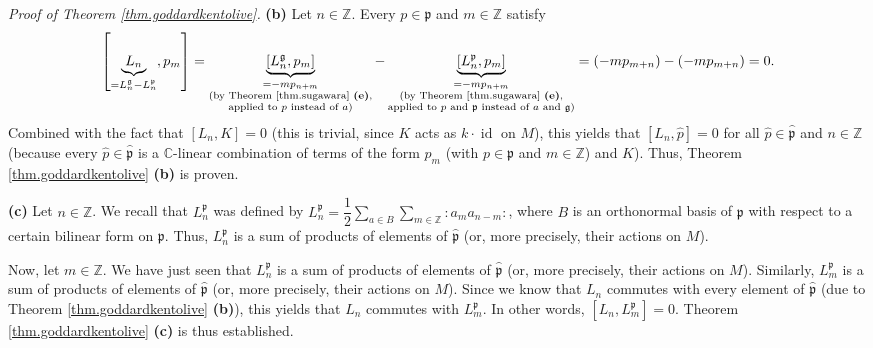 \documentclass[etingof-lie.tex]{subfiles}
\begin{document}
\textit{Proof of Theorem \ref{thm.goddardkentolive}.} \textbf{(b)} Let
$n\in\mathbb{Z}$. Every $p\in\mathfrak{p}$ and $m\in\mathbb{Z}$ satisfy%
\[
\left[  \underbrace{L_{n}}_{=L_{n}^{\mathfrak{g}}-L_{n}^{\mathfrak{p}}}%
,p_{m}\right]  =\underbrace{\left[  L_{n}^{\mathfrak{g}},p_{m}\right]
}_{\substack{=-mp_{n+m}\\\text{(by Theorem \ref{thm.sugawara} \textbf{(e)}%
,}\\\text{applied to }p\text{ instead of }a\text{)}}}-\underbrace{\left[
L_{n}^{\mathfrak{p}},p_{m}\right]  }_{\substack{=-mp_{n+m}\\\text{(by Theorem
\ref{thm.sugawara} \textbf{(e)},}\\\text{applied to }p\text{ and }%
\mathfrak{p}\text{ instead of }a\text{ and }\mathfrak{g}\text{)}}}=\left(
-mp_{m+n}\right)  -\left(  -mp_{m+n}\right)  =0.
\]
Combined with the fact that $\left[  L_{n},K\right]  =0$ (this is trivial,
since $K$ acts as $k\cdot\operatorname*{id}$ on $M$), this yields that
$\left[  L_{n},\widehat{p}\right]  =0$ for all $\widehat{p}\in
\widehat{\mathfrak{p}}$ and $n\in\mathbb{Z}$ (because every $\widehat{p}%
\in\widehat{\mathfrak{p}}$ is a $\mathbb{C}$-linear combination of terms of
the form $p_{m}$ (with $p\in\mathfrak{p}$ and $m\in\mathbb{Z}$) and $K$).
Thus, Theorem \ref{thm.goddardkentolive} \textbf{(b)} is proven.

\textbf{(c)} Let $n\in\mathbb{Z}$. We recall that $L_{n}^{\mathfrak{p}}$ was
defined by $L_{n}^{\mathfrak{p}}=\dfrac{1}{2}\sum\limits_{a\in B}%
\sum\limits_{m\in\mathbb{Z}}\left.  :a_{m}a_{n-m}:\right.  $, where $B$ is an
orthonormal basis of $\mathfrak{p}$ with respect to a certain bilinear form on
$\mathfrak{p}$. Thus, $L_{n}^{\mathfrak{p}}$ is a sum of products of elements
of $\widehat{\mathfrak{p}}$ (or, more precisely, their actions on $M$).

Now, let $m\in\mathbb{Z}$. We have just seen that $L_{n}^{\mathfrak{p}}$ is a
sum of products of elements of $\widehat{\mathfrak{p}}$ (or, more precisely,
their actions on $M$). Similarly, $L_{m}^{\mathfrak{p}}$ is a sum of products
of elements of $\widehat{\mathfrak{p}}$ (or, more precisely, their actions on
$M$). Since we know that $L_{n}$ commutes with every element of
$\widehat{\mathfrak{p}}$ (due to Theorem \ref{thm.goddardkentolive}
\textbf{(b)}), this yields that $L_{n}$ commutes with $L_{m}^{\mathfrak{p}}$.
In other words, $\left[  L_{n},L_{m}^{\mathfrak{p}}\right]  =0$. Theorem
\ref{thm.goddardkentolive} \textbf{(c)} is thus established.
\end{document}
